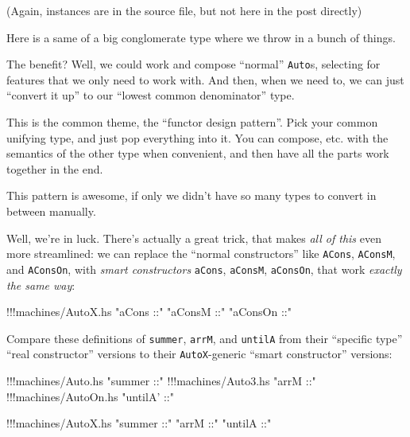 \documentclass[]{article}
\newenvironment{Shaded}{}{}
\newcommand{\StringTok}[1]{\textcolor[rgb]{0.25,0.44,0.63}{{#1}}}
\newcommand{\FunctionTok}[1]{\textcolor[rgb]{0.02,0.16,0.49}{{#1}}}
\newcommand{\NormalTok}[1]{{#1}}
\begin{document}
(Again, instances are in the source file, but not here in the post
directly)

Here is a same of a big conglomerate type where we throw in a bunch of
things.

The benefit? Well, we could work and compose ``normal'' \texttt{Auto}s,
selecting for features that we only need to work with. And then, when we
need to, we can just ``convert it up'' to our ``lowest common
denominator'' type.

This is the common theme, the ``functor design pattern''. Pick your
common unifying type, and just pop everything into it. You can compose,
etc. with the semantics of the other type when convenient, and then have
all the parts work together in the end.

This pattern is awesome, if only we didn't have so many types to convert
in between manually.

Well, we're in luck. There's actually a great trick, that makes
\emph{all of this} even more streamlined: we can replace the ``normal
constructors'' like \texttt{ACons}, \texttt{AConsM}, and
\texttt{AConsOn}, with \emph{smart constructors} \texttt{aCons},
\texttt{aConsM}, \texttt{aConsOn}, that work \emph{exactly the same
way}:

\begin{Shaded}
\begin{Highlighting}[]
\FunctionTok{!!!}\NormalTok{machines}\FunctionTok{/}\NormalTok{AutoX.hs }\StringTok{"aCons ::"} \StringTok{"aConsM ::"} \StringTok{"aConsOn ::"}
\end{Highlighting}
\end{Shaded}

Compare these definitions of \texttt{summer}, \texttt{arrM}, and
\texttt{untilA} from their ``specific type'' ``real constructor''
versions to their \texttt{AutoX}-generic ``smart constructor'' versions:

\begin{Shaded}
\begin{Highlighting}[]
\FunctionTok{!!!}\NormalTok{machines}\FunctionTok{/}\NormalTok{Auto.hs }\StringTok{"summer ::"}
\FunctionTok{!!!}\NormalTok{machines}\FunctionTok{/}\NormalTok{Auto3.hs }\StringTok{"arrM ::"}
\FunctionTok{!!!}\NormalTok{machines}\FunctionTok{/}\NormalTok{AutoOn.hs }\StringTok{"untilA' ::"}
\end{Highlighting}
\end{Shaded}

\begin{Shaded}
\begin{Highlighting}[]
\FunctionTok{!!!}\NormalTok{machines}\FunctionTok{/}\NormalTok{AutoX.hs }\StringTok{"summer ::"} \StringTok{"arrM ::"} \StringTok{"untilA ::"}
\end{Highlighting}
\end{Shaded}
\end{document}
